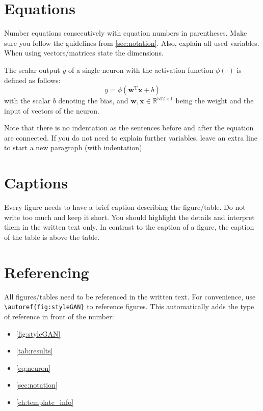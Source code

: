 \section{Equations}
Number equations consecutively with equation numbers in parentheses. Make sure you follow the guidelines from \autoref{sec:notation}. Also, explain all used variables. When using vectors/matrices state the dimensions.

The scalar output $y$ of a single neuron with the activation function $\phi\left(\cdot\right)$ is defined as follows:
\begin{equation}
  y = \phi\left(\boldsymbol{w}^{\text{T}}\boldsymbol{x} + b\right)
  \label{eq:neuron}
\end{equation}
with the scalar $b$ denoting the bias, and $\boldsymbol{w}, \boldsymbol{x} \in \mathbb{R}^{512 \times 1}$ being the weight and the input of vectors of the neuron.

Note that there is no indentation as the sentences before and after the equation are connected. If you do not need to explain further variables, leave an extra line to start a new paragraph (with indentation).

\section{Captions}
Every figure needs to have a brief caption describing the figure/table. Do not write too much and keep it short. You should highlight the details and interpret them in the written text only. In contrast to the caption of a figure, the caption of the table is above the table. 


\section{Referencing}
All figures/tables need to be referenced in the written text. For convenience, use \verb'\autoref{fig:styleGAN}' to reference figures. This automatically adds the type of reference in front of the number:
\begin{itemize}
  \item \autoref{fig:styleGAN}
  \item \autoref{tab:results}
  \item \autoref{eq:neuron}
  \item \autoref{sec:notation}
  \item \autoref{ch:template_info}
\end{itemize}


